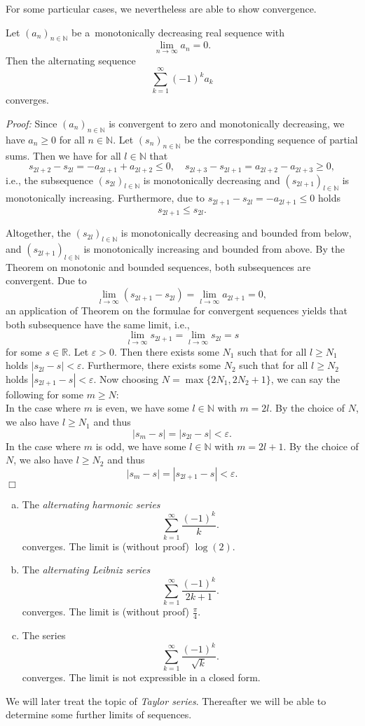  

For some particular cases, we nevertheless are able to show convergence.
\begin{Theorem}
\label{th:Leibnizcrit}
Let $(a_n)_{n\in\mathbb{N}}$ be a~monotonically decreasing real sequence with
\[\lim_{n\to\infty}a_n=0.\]
Then the alternating sequence
\[\sum_{k=1}^\infty (-1)^ka_k\]
converges.
\end{Theorem}
{\em Proof:} Since $(a_n)_{n\in\mathbb{N}}$ is convergent to zero and monotonically decreasing, we have $a_n\geq0$ for all $n\in\mathbb{N}$. Let $(s_n)_{n\in\mathbb{N}}$ be the corresponding sequence of partial sums.
Then we have for all $l\in \mathbb{N}$ that
\[s_{2l+2}-s_{2l}=-a_{2l+1}+a_{2l+2}\leq 0,\quad s_{2l+3}-s_{2l+1}=a_{2l+2}-a_{2l+3}\geq 0,\]
i.e., the subsequence $(s_{2l})_{l\in\mathbb{N}}$ is monotonically decreasing and $(s_{2l+1})_{l\in\mathbb{N}}$ is monotonically increasing. Furthermore, due to $s_{2l+1}-s_{2l}=-a_{2l+1}\leq0$ holds
\[s_{2l+1}\leq s_{2l}.\]

Altogether, the $(s_{2l})_{l\in\mathbb{N}}$ is monotonically decreasing and bounded from below, and $(s_{2l+1})_{l\in\mathbb{N}}$ is monotonically increasing and bounded from above.
By the Theorem on monotonic and bounded sequences, both subsequences are convergent. Due to
\[\lim_{l\to\infty}(s_{2l+1}-s_{2l})=\lim_{l\to\infty}a_{2l+1}=0,\]
an application of Theorem on the formulae for convergent sequences yields that both subsequence have the same limit, i.e.,
\[\lim_{l\to\infty}s_{2l+1}=\lim_{l\to\infty}s_{2l}=s\]
for some $s\in\mathbb{R}$. Let $\varepsilon>0$. Then there exists some $N_1$ such that for all $l\geq N_1$ holds $|s_{2l}-s|<\varepsilon$. Furthermore, there exists some $N_2$ such that for all $l\geq N_2$ holds $|s_{2l+1}-s|<\varepsilon$. Now choosing $N=\max\{2N_1,2N_2+1\}$, we can say the following for some $m\geq N$:\\
In the case where $m$ is even, we have some $l\in\mathbb{N}$ with $m=2l$. By the choice of $N$, we also have $l\geq N_1$ and thus
\[|s_{m}-s|=|s_{2l}-s|<\varepsilon.\]
In the case where $m$ is odd, we have some $l\in\mathbb{N}$ with $m=2l+1$. By the choice of $N$, we also have $l\geq N_2$ and thus
\[|s_{m}-s|=|s_{2l+1}-s|<\varepsilon.\]
\hfill$\Box$

\begin{example}\label{ex:leib}
\begin{enumerate}[(a)]
 \item  The {\em alternating harmonic series}
\[\sum_{k=1}^\infty \frac{(-1)^k}{k}.\]
converges. The limit is (without proof) $\log(2)$.
 \item  The {\em alternating Leibniz series}
\[\sum_{k=1}^\infty \frac{(-1)^k}{2k+1}.\]
converges. The limit is (without proof) $\frac\pi4$.
 \item  The series
\[\sum_{k=1}^\infty \frac{(-1)^k}{\sqrt{k}}.\]
converges. The limit is not expressible in a closed form.
\end{enumerate}
\end{example}
We will later treat the topic of {\em Taylor series}. Thereafter we will be able to determine some further limits of sequences.

